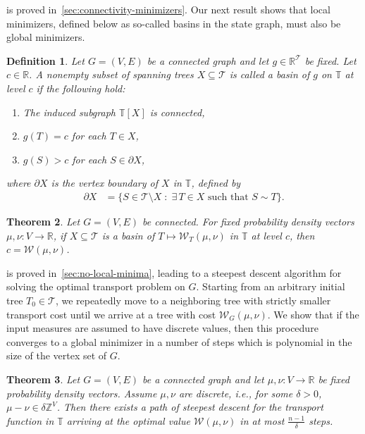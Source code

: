 \documentclass[11pt,a4paper]{article}
\newcommand{\wass}{{\mathcal{W}}}
\newcommand{\setoftrees}{{\mathcal{T}}}
\newcommand{\stategraph}{{\mathbb{T}}}
\newtheorem{theorem}{Theorem}[section]
\newtheorem{definition}[theorem]{Definition}
\begin{document}
     is proved in~\cref{sec:connectivity-minimizers}. Our next result shows that local minimizers, defined below as so-called basins in the state graph, must also be global minimizers. 

    \begin{definition}\label{def:basin}
        Let $G=(V,E)$ be a connected graph and let $g\in\mathbb{R}^{\setoftrees}$ be fixed. Let $c\in\mathbb{R}$. A nonempty subset of spanning trees $X\subseteq \setoftrees$ is called a \emph{basin of $g$ on $\stategraph$ at level $c$} if the following hold:
            \begin{enumerate}[label=(\roman*)]
                \item The induced subgraph $\stategraph[X]$ is connected,
                \item $g(T) = c$ for each $T\in X$,
                \item $g(S) > c$ for each $S\in\partial X$,
            \end{enumerate}
        where $\partial{X}$ is the vertex boundary of $X$ in $\stategraph$, defined by
            \begin{align*}
                \partial X &= \{S\in\setoftrees\setminus X \;:\; \exists\, T\in X \text{ such that } S\sim T\}.
            \end{align*}
    \end{definition}

    \begin{theorem}\label{thm:intro-basins}
        Let $G=(V,E)$ be connected. For fixed probability density vectors $\mu,\nu:V\to\mathbb{R}$, if $X\subseteq\setoftrees$ is a basin of $T\mapsto\wass_T(\mu,\nu)$ in $\stategraph$ at level $c$, then $c=\wass(\mu,\nu)$.
    \end{theorem}

     is proved in~\cref{sec:no-local-minima}, leading to a steepest descent algorithm for solving the optimal transport problem on $G$. Starting from an arbitrary initial tree $T_0\in\setoftrees$, we repeatedly move to a neighboring tree with strictly smaller transport cost until we arrive at a tree with cost $\wass_G(\mu,\nu)$. We show that if the input measures are assumed to have discrete values, then this procedure converges to a global minimizer in a number of steps which is polynomial in the size of the vertex set of $G$.

    \begin{theorem}\label{thm:steepest-descent-empirical}
        Let $G=(V,E)$ be a connected graph and let $\mu,\nu:V\to\mathbb{R}$ be fixed probability density vectors. Assume $\mu,\nu$ are \emph{discrete}, i.e., for some $\delta>0$, $\mu-\nu\in\delta\mathbb{Z}^{V}$. Then there exists a path of steepest descent for the transport function in $\stategraph$ arriving at the optimal value $\wass(\mu,\nu)$ in at most $\frac{n-1}{\delta}$ steps.
    \end{theorem}
\end{document}
